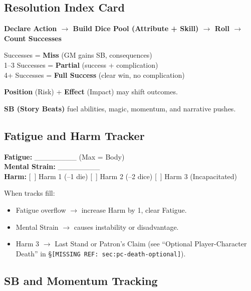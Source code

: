 \subsection{Resolution Index Card}

\begin{tcolorbox}[colback=white,colframe=black,left=1em,right=1em,top=0.5em,bottom=0.5em,breakable]
\textbf{Declare Action $\rightarrow$ Build Dice Pool (Attribute + Skill) $\rightarrow$ Roll $\rightarrow$ Count Successes}

 Successes = \textbf{Miss} (GM gains SB, consequences) \\
1--3 Successes = \textbf{Partial} (success + complication) \\
4+ Successes = \textbf{Full Success} (clear win, no complication)

\smallskip
\textbf{Position} (Risk) + \textbf{Effect} (Impact) may shift outcomes.

\smallskip
\textbf{SB (Story Beats)} fuel abilities, magic, momentum, and narrative pushes.
\end{tcolorbox}

\subsection{Fatigue and Harm Tracker}

\begin{tcolorbox}[colback=white,colframe=black,left=1em,right=1em,top=0.5em,bottom=0.5em,breakable]
\textbf{Fatigue:} \_\_\_\_\_\_\_\_  (Max = Body) \\
\textbf{Mental Strain:} \_\_\_\_\_\_\_\_ \\
\textbf{Harm:} [~] Harm 1 (--1 die) [~] Harm 2 (--2 dice) [~] Harm 3 (Incapacitated)

\medskip
When tracks fill:
\begin{itemize}
    \item Fatigue overflow $\rightarrow$ increase Harm by 1, clear Fatigue.
    \item Mental Strain $\rightarrow$ causes instability or disadvantage.
    \item Harm 3 $\rightarrow$ Last Stand or Patron's Claim (see ``Optional Player-Character Death'' in \S\texttt{[MISSING REF: sec:pc-death-optional]}).
\end{itemize}
\end{tcolorbox}

\subsection{SB and Momentum Tracking}

